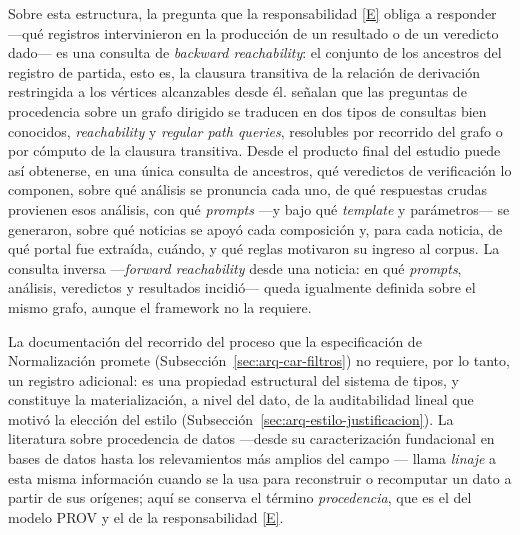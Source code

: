 \documentclass[12pt]{report}
\DeclareRobustCommand{\resp}[1]{\hyperref[tab:registro-responsabilidades]{\textcolor{respcolor}{[#1]}}}
\begin{document}
Sobre esta estructura, la pregunta que la responsabilidad \resp{E} obliga a responder ---qué registros intervinieron en la producción de un resultado o de un veredicto dado--- es una consulta de \textit{backward reachability}: el conjunto de los ancestros del registro de partida, esto es, la clausura transitiva de la relación de derivación restringida a los vértices alcanzables desde él. \citet{cuevasvicenttin:2012} señalan que las preguntas de procedencia sobre un grafo dirigido se traducen en dos tipos de consultas bien conocidos, \textit{reachability} y \textit{regular path queries}, resolubles por recorrido del grafo o por cómputo de la clausura transitiva. Desde el producto final del estudio puede así obtenerse, en una única consulta de ancestros, qué veredictos de verificación lo componen, sobre qué análisis se pronuncia cada uno, de qué respuestas crudas provienen esos análisis, con qué \textit{prompts} ---y bajo qué \textit{template} y parámetros--- se generaron, sobre qué noticias se apoyó cada composición y, para cada noticia, de qué portal fue extraída, cuándo, y qué reglas motivaron su ingreso al corpus. La consulta inversa ---\textit{forward reachability} desde una noticia: en qué \textit{prompts}, análisis, veredictos y resultados incidió--- queda igualmente definida sobre el mismo grafo, aunque el framework no la requiere.

La documentación del recorrido del proceso que la especificación de Normalización promete (Subsección~\ref{sec:arq-car-filtros}) no requiere, por lo tanto, un registro adicional: es una propiedad estructural del sistema de tipos, y constituye la materialización, a nivel del dato, de la auditabilidad lineal que motivó la elección del estilo (Subsección~\ref{sec:arq-estilo-justificacion}). La literatura sobre procedencia de datos ---desde su caracterización fundacional en bases de datos \citep{buneman:2001,cheney:2009} hasta los relevamientos más amplios del campo \citep{herschel:2017}--- llama \textit{linaje} a esta misma información cuando se la usa para reconstruir o recomputar un dato a partir de sus orígenes; aquí se conserva el término \textit{procedencia}, que es el del modelo PROV y el de la responsabilidad \resp{E}.


\end{document}
